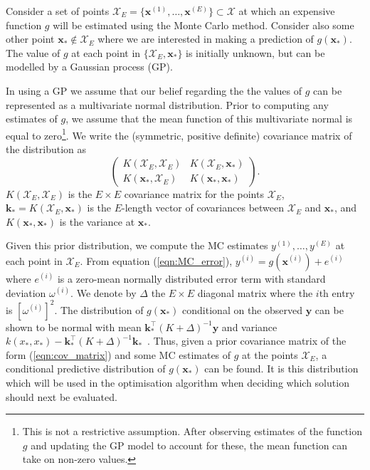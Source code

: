\documentclass{article} %
\begin{document}

Consider a set of points $\mathcal{X}_{E} = \{ \textbf{x}^{(1)}, \ldots , \textbf{x}^{(E)} \} \subset \mathcal{X}$ at which an expensive function $g$ will be estimated using the Monte Carlo method. Consider also some other point $\mathbf{x}_{*} \not\in \mathcal{X}_{E}$ where we are interested in making a prediction of $g(\mathbf{x}_{*})$. The value of $g$ at each point in $\{\mathcal{X}_{E}, \mathbf{x}_{*}\}$ is initially unknown, but can be modelled by a Gaussian process (GP). 

In using a GP we assume that our belief regarding the the values of $g$ can be represented as a multivariate normal distribution. Prior to computing any estimates of $g$, we assume that the mean function of this multivariate normal is equal to zero\footnote{This is not a restrictive assumption. After observing estimates of the function $g$ and updating the GP model to account for these, the mean function can take on non-zero values.}.
We write the (symmetric, positive definite) covariance matrix of the distribution as
\begin{equation}\label{eqn:cov_matrix}
\begin{pmatrix}
K(\mathcal{X}_{E}, \mathcal{X}_{E}) & K(\mathcal{X}_{E}, \mathbf{x}_{*}) \\
K(\mathbf{x}_{*}, \mathcal{X}_{E}) & K(\mathbf{x}_{*}, \mathbf{x}_{*})
\end{pmatrix}.
\end{equation}
$K(\mathcal{X}_{E}, \mathcal{X}_{E})$ is the $E \times E$ covariance matrix for the points $\mathcal{X}_{E}$, $\mathbf{k}_{*} = K(\mathcal{X}_{E}, \mathbf{x}_{*})$ is the $E$-length vector of covariances between $\mathcal{X}_{E}$ and $\mathbf{x}_{*}$, and $K(\mathbf{x}_{*}, \mathbf{x}_{*})$ is the variance at $\mathbf{x}_{*}$.

Given this prior distribution, we compute the MC estimates $y^{(1)} , \ldots , y^{(E)}$ at each point in $\mathcal{X}_{E}$. From equation (\ref{eqn:MC_error}), $y^{(i)} = g(\textbf{x}^{(i)}) + e^{(i)}$ where $e^{(i)}$ is a zero-mean normally distributed error term with standard deviation $\omega^{(i)}$. We denote by $\Delta$ the $E \times E$ diagonal matrix where the $i$th entry is $[\omega^{(i)}]^{2}$. The distribution of $g(\mathbf{x}_{*})$ conditional on the observed $\mathbf{y}$ can be shown to be normal with mean $\mathbf{k}_{*}^\top(K + \Delta)^{-1}\mathbf{y}$ and variance $k(x_{*}, x_{*})-\mathbf{k}_{*}^\top(K + \Delta)^{-1}\mathbf{k}_{*}$~\cite{Rasmussen2006}. Thus, given a prior covariance matrix of the form (\ref{eqn:cov_matrix}) and some MC estimates of $g$ at the points $\mathcal{X}_{E}$, a conditional predictive distribution of $g(\mathbf{x}_{*})$ can be found. It is this distribution which will be used in the optimisation algorithm when deciding which solution should next be evaluated.
\end{document}
